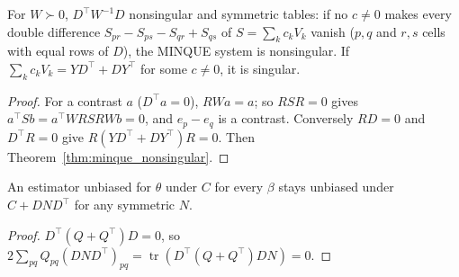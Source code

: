 \begin{lemma}\label{lem:minque_contrasts}
  \leanok
  For $W \succ 0$, $D^\top W^{-1}D$ nonsingular and symmetric tables: if no $c \ne 0$ makes every
  double difference $S_{pr} - S_{ps} - S_{qr} + S_{qs}$ of $S = \sum_kc_kV_k$ vanish ($p, q$ and
  $r, s$ cells with equal rows of $D$), the MINQUE system is nonsingular. If
  $\sum_kc_kV_k = YD^\top + DY^\top$ for some $c \ne 0$, it is singular.
\end{lemma}
\begin{proof}
  \leanok
  For a contrast $a$ ($D^\top a = 0$), $RWa = a$; so $RSR = 0$ gives
  $a^\top Sb = a^\top WRSRWb = 0$, and $e_p - e_q$ is a contrast. Conversely $RD = 0$ and
  $D^\top R = 0$ give $R(YD^\top + DY^\top)R = 0$. Then Theorem~\ref{thm:minque_nonsingular}.
\end{proof}

\begin{theorem}\label{thm:unbiased_add_design}
  \leanok
  An estimator unbiased for $\theta$ under $C$ for every $\beta$ stays unbiased under
  $C + DND^\top$ for any symmetric $N$.
\end{theorem}
\begin{proof}
  \leanok
  $D^\top(Q + Q^\top)D = 0$, so $2\sum_{pq}Q_{pq}(DND^\top)_{pq}
  = \operatorname{tr}(D^\top(Q + Q^\top)DN) = 0$.
\end{proof}

